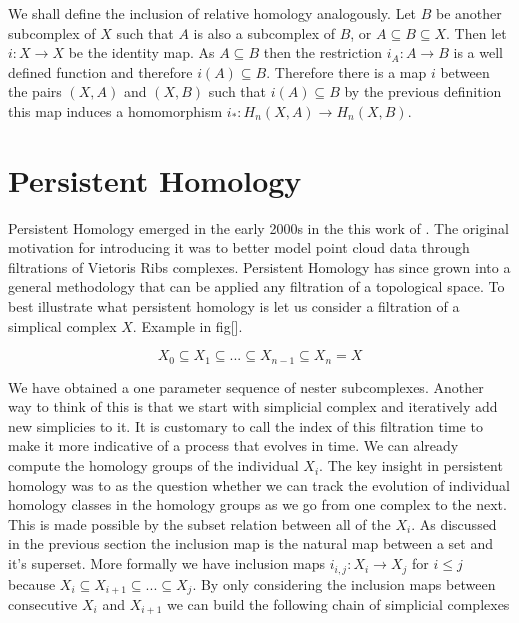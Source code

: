 We shall define the inclusion of relative homology analogously. Let $B$ be another subcomplex of $X$ such that $A$ is also a subcomplex of $B$, or $A \subseteq B \subseteq X$. Then let $i : X \to X$ be the identity map. As $A \subseteq B$ then the restriction $i_A: A \to B$ is a well defined function and therefore $i(A) \subseteq B$. Therefore there is a map $i$ between the pairs $(X, A)$ and $(X, B)$ such that $i(A) \subseteq B$ by the previous definition this map induces a homomorphism $i_* : H_n(X, A) \to H_n(X, B)$.



\section{Persistent Homology}


Persistent Homology emerged in the early 2000s in the this work of \cite{persistence-original}. The original motivation for introducing it was to better model point cloud data through filtrations of Vietoris Ribs complexes. Persistent Homology has since grown into a general methodology that can be applied any filtration of a topological space. To best illustrate what persistent homology is let us consider a filtration of a simplical complex $X$. Example in fig[].

$$ X_0 \subseteq X_1 \subseteq ... \subseteq X_{n-1} \subseteq X_n = X$$

We have obtained a one parameter sequence of nester subcomplexes. Another way to think of this is that we start with simplicial complex and iteratively add new simplicies to it. It is customary to call the index of this filtration time to make it more indicative of a process that evolves in time. We can already compute the homology groups of the individual $X_i$. The key insight in persistent homology was to as the question whether we can track the evolution of individual homology classes in the homology groups as we go from one complex to the next. This is made possible by the subset relation between all of the $X_i$. As discussed in the previous section the inclusion map is the natural map between a set and it's superset. More formally we have inclusion maps $i_{i, j}: X_i \to X_j$ for $i \le j$ because $X_i \subseteq X_{i+1} \subseteq ... \subseteq X_j$. 
By only considering the inclusion maps between consecutive $X_i$ and $X_{i+1}$ we can build the following chain of simplicial complexes


